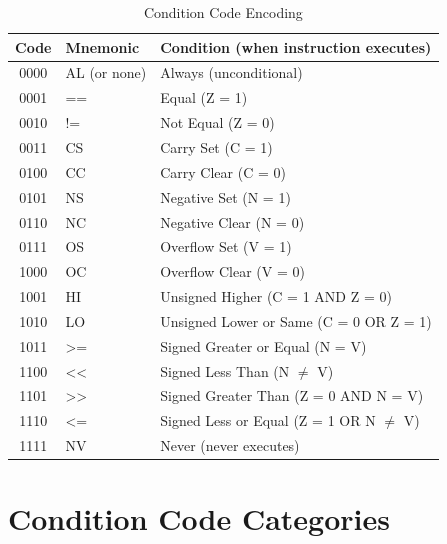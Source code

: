 \begin{table}[H]
	\centering
	\small
	\begin{tabular}{clp{7cm}}
		\toprule
		\textbf{Code} & \textbf{Mnemonic} & \textbf{Condition (when instruction executes)} \\
		\midrule
		0000          & AL (or none)      & Always (unconditional)                         \\
		0001          & ==                & Equal (Z = 1)                                  \\
		0010          & !=                & Not Equal (Z = 0)                              \\
		0011          & CS                & Carry Set (C = 1)                              \\
		0100          & CC                & Carry Clear (C = 0)                            \\
		0101          & NS                & Negative Set (N = 1)                           \\
		0110          & NC                & Negative Clear (N = 0)                         \\
		0111          & OS                & Overflow Set (V = 1)                           \\
		1000          & OC                & Overflow Clear (V = 0)                         \\
		1001          & HI                & Unsigned Higher (C = 1 AND Z = 0)              \\
		1010          & LO                & Unsigned Lower or Same (C = 0 OR Z = 1)        \\
		1011          & >=                & Signed Greater or Equal (N = V)                \\
		1100          & <<                & Signed Less Than (N $\neq$ V)                  \\
		1101          & >>                & Signed Greater Than (Z = 0 AND N = V)          \\
		1110          & <=                & Signed Less or Equal (Z = 1 OR N $\neq$ V)     \\
		1111          & NV                & Never (never executes)                         \\
		\bottomrule
	\end{tabular}
	\caption{Condition Code Encoding}
	\label{tab:condition-codes}
\end{table}

\section{Condition Code Categories}


